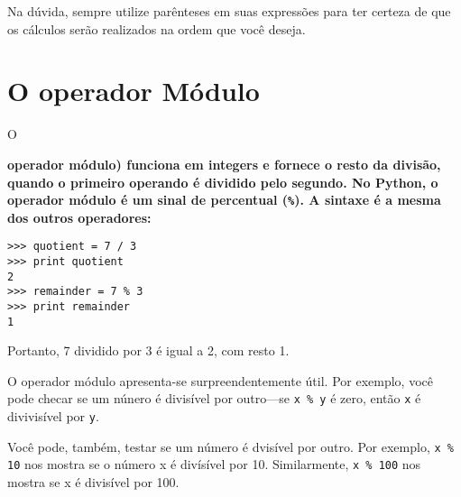 {{{{{{{{{{{{{Na dúvida, sempre utilize parênteses em suas expressões para ter certeza 
de que os cálculos serão realizados na ordem que você deseja.

\section{O operador Módulo}


O {\bf operador módulo) funciona em integers e fornece o resto da divisão,
quando o primeiro operando é dividido pelo segundo. No Python, o 
operador módulo é um sinal de percentual (\verb"%"). A sintaxe é a mesma 
dos outros operadores:

\beforeverb
\begin{verbatim}
>>> quotient = 7 / 3
>>> print quotient
2
>>> remainder = 7 % 3
>>> print remainder
1
\end{verbatim}
\afterverb
%

Portanto, 7 dividido por 3 é igual a 2, com resto 1.

O operador módulo apresenta-se surpreendentemente útil. Por 
exemplo, você pode checar se um núnero é divisível por outro---se 
{\tt x \% y} é zero, então {\tt x} é divivisível por {\tt y}.


Você pode, também, testar se um número é dvisível por outro. 
Por exemplo, {\tt x \% 10} nos mostra se o número x é
divísível por 10. Similarmente, {\tt x \% 100}
nos mostra se x é divisível por 100.

}}}}}}}}}}}}}}
